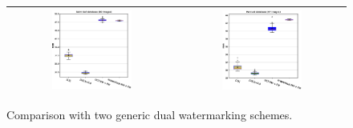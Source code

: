 \documentclass[runningheads]{llncs}
\begin{document}
\begin{figure}[H]
	\begin{center}
		\begin{tabular}{|c|c|}\hline
			\includegraphics[width=0.5\textwidth]{comparative_PSNR_saintgall.eps}
			&\includegraphics[width=0.5\textwidth]{comparative_PSNR_parzival.eps}\\\hline
		\end{tabular}
	\end{center}
	\caption{Comparison with two generic dual watermarking schemes.}
	\label{psnr1}
\end{figure}
\end{document}

